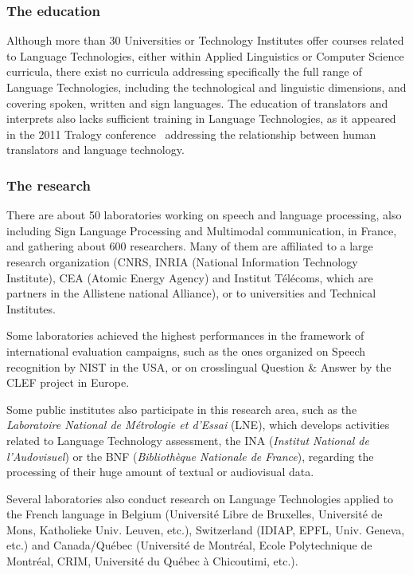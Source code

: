 \begin{multicols}{2}
\subsubsection{The education}

Although more than 30 Universities or Technology Institutes offer
courses related to Language Technologies, either within Applied
Linguistics or Computer Science curricula, there exist no curricula
addressing specifically the full range of Language Technologies,
including the technological and linguistic dimensions, and covering
spoken, written and sign languages. The education of translators and
interprets also lacks sufficient training in Language Technologies, as
it appeared in the 2011 Tralogy conference~\cite{tralogy} addressing the
relationship between human translators and language technology.

\subsubsection{The research}

There are about 50 laboratories working on speech and language
processing, also including Sign Language Processing and Multimodal
communication, in France, and gathering about 600 researchers. Many of
them are affiliated to a large research organization (CNRS, INRIA
(National Information Technology Institute), CEA (Atomic Energy
Agency) and Institut Télécoms, which are partners in the Allistene
national Alliance), or to universities and Technical Institutes.

Some laboratories achieved the highest performances in the framework
of international evaluation campaigns, such as the ones organized on
Speech recognition by NIST in the USA, or on crosslingual
Question \& Answer by the CLEF project in Europe.

Some public institutes also participate in this research area, such as
the {\em Laboratoire National de Métrologie et d’Essai} (LNE), which
develops activities related to Language Technology assessment, the INA
({\em Institut National de l’Audovisuel}) or the BNF ({\em Bibliothèque Nationale
de France}), regarding the processing of their huge amount of textual
or audiovisual data.

Several laboratories also conduct research on Language Technologies
applied to the French language in Belgium (Université  Libre de Bruxelles,
Université de Mons, Katholieke Univ. Leuven, etc.), Switzerland
(IDIAP, EPFL, Univ. Geneva, etc.) and Canada/Québec (Université de
Montréal, Ecole Polytechnique de Montréal, CRIM, Université du Québec
à Chicoutimi, etc.).


\end{multicols}
